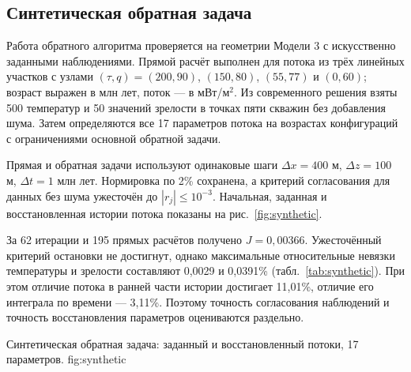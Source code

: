 \subsection{Синтетическая обратная задача}

Работа обратного алгоритма проверяется на геометрии Модели 3
с искусственно заданными наблюдениями. Прямой расчёт выполнен
для потока из трёх линейных участков с узлами
$(\tau,q)=(200,90)$, $(150,80)$, $(55,77)$ и $(0,60)$;
возраст выражен в млн лет, поток --- в мВт/м$^2$.
Из современного решения взяты 500 температур и 50 значений зрелости
в точках пяти скважин без добавления шума.
Затем определяются все 17 параметров потока на возрастах
конфигураций с ограничениями основной обратной задачи.

Прямая и обратная задачи используют одинаковые шаги
$\Delta x=400$ м, $\Delta z=100$ м, $\Delta t=1$ млн лет.
Нормировка по 2\% сохранена, а критерий согласования для данных
без шума ужесточён до $|r_j|\leq10^{-3}$.
Начальная, заданная и восстановленная истории потока
показаны на рис.~\ref{fig:synthetic}.

За 62 итерации и 195 прямых расчётов получено $J=0{,}00366$.
Ужесточённый критерий остановки не достигнут, однако максимальные
относительные невязки температуры и зрелости составляют
0,0029 и 0,0391\% (табл.~\ref{tab:synthetic}).
При этом отличие потока в ранней части истории достигает 11,01\%,
отличие его интеграла по времени --- 3,11\%.
Поэтому точность согласования наблюдений и точность восстановления
параметров оцениваются раздельно.

  {Синтетическая обратная задача: заданный и восстановленный потоки, 17 параметров.}
  {fig:synthetic}


